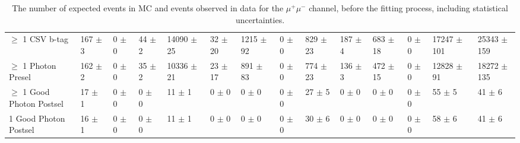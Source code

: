 \begin{table}
{\begin{tabular}{|l|l|l|l|l|l|l|l|l|l|l|l|l|l|}
$\geq$ 1 CSV b-tag & 167 $\pm$ 3 \ & 0 $\pm$ 0 \ & 44 $\pm$ 2 \ & 14090 $\pm$ 25 \ & 32 $\pm$ 20 \ & 1215 $\pm$ 92 \ & 0 $\pm$ 0 \ & 829 $\pm$ 23 \ & 187 $\pm$ 4 \ & 683 $\pm$ 18 \ & 0 $\pm$ 0\ & 17247 $\pm$ 101 \ & 25343 $\pm$ 159 \\
$\geq$ 1 Photon Presel & 162 $\pm$ 2 \ & 0 $\pm$ 0 \ & 35 $\pm$ 2 \ & 10336 $\pm$ 21 \ & 23 $\pm$ 17 \ & 891 $\pm$ 83 \ & 0 $\pm$ 0 \ & 774 $\pm$ 23 \ & 136 $\pm$ 3 \ & 472 $\pm$ 15 \ & 0 $\pm$ 0\ & 12828 $\pm$ 91 \ & 18272 $\pm$ 135 \\
$\geq$ 1 Good Photon Postsel & 17 $\pm$ 1 \ & 0 $\pm$ 0 \ & 0 $\pm$ 0 \ & 11 $\pm$ 1 \ & 0 $\pm$ 0 \ & 0 $\pm$ 0 \ & 0 $\pm$ 0 \ & 27 $\pm$ 5 \ & 0 $\pm$ 0 \ & 0 $\pm$ 0 \ & 0 $\pm$ 0\ & 55 $\pm$ 5 \ & 41 $\pm$ 6 \\
1 Good Photon Postsel & 16 $\pm$ 1 \ & 0 $\pm$ 0 \ & 0 $\pm$ 0 \ & 11 $\pm$ 1 \ & 0 $\pm$ 0 \ & 0 $\pm$ 0 \ & 0 $\pm$ 0 \ & 30 $\pm$ 6 \ & 0 $\pm$ 0 \ & 0 $\pm$ 0 \ & 0 $\pm$ 0\ & 58 $\pm$ 6 \ & 41 $\pm$ 6 \\
\hline
\end{tabular}
}
\caption{The number of expected events in MC and events observed in data for the $\mu^+\mu^-$ channel, before the fitting process, including statistical uncertainties.}
\label{tab-cutflowMuMu}

\resizebox{\columnwidth}{!} {

}
\end{table}
